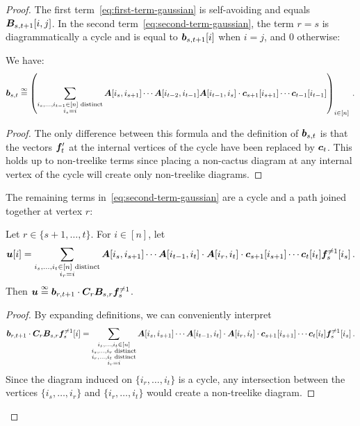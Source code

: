 \begin{proof}
    The first term~\cref{eq:first-term-gaussian} is self-avoiding and equals ${\bm B}_{s,t+1}[i,j]$.
    In the second term~\cref{eq:second-term-gaussian}, the term $r=s$ is diagrammatically a cycle
    and is equal to ${\bm b}_{s,t+1}[i]$ when $i=j$, and $0$ otherwise:

    \begin{claim}\label{lem:bst-c}
    We have:
    \[
        {\bm b}_{s,t} \overset{\infty}{=} \left(\sum_{\substack{i_s,\ldots,i_{t-1}\in[n] \textnormal{ distinct}\\i_s=i}}
        {\bm A}[i_s,i_{s+1}] \cdots {\bm A}[i_{t-2},i_{t-1}] {\bm A}[i_{t-1},i_s] \cdot {\bm c}_{s+1}[i_{s+1}] \cdots {\bm c}_{t-1}[i_{t-1}]\right)_{i\in [n]}\,.
    \]
    \end{claim}
    \begin{proof}
        The only difference between this formula and the definition of ${\bm b}_{s,t}$ is that the vectors ${\bm f}'_t$ at the internal vertices of the cycle have been replaced by ${\bm c}_t$.
        This holds up to non-treelike terms since placing a non-cactus diagram at any internal vertex of the cycle will create only non-treelike diagrams.
    \end{proof}    
    \noindent The remaining terms in~\cref{eq:second-term-gaussian} are a cycle and a path joined together at vertex $r$:
    
    \begin{claim}\label{claim:factorize-inside-path-cycle}
        Let $r\in \{s+1, \ldots, t\}$. For $i\in [n]$, let
        \[
            \bm u[i] =         \sum_{\substack{i_{s},\dots, i_{t} \in [n] \textnormal{ distinct}\\i_{r} = i}} 
    {\bm A}[i_s, i_{s+1}] \cdots {\bm A}[i_{t-1},i_t] \cdot {\bm A}[i_r,i_t] \cdot \bm c_{s+1}[i_{s+1}] \cdots \bm c_{t}[i_{t}] {\bm f}_s^{\neq 1}[i_s]\,.
        \]
        Then $\bm u \overset{\infty}{=} \bm b_{r,t+1} \cdot \bm C_r \bm B_{s,r} {\bm f}_s^{\neq 1}$.
    \end{claim}

    \begin{proof}
        By expanding definitions, we can conveniently interpret
        \[
            \bm b_{r,t+1} \cdot \bm C_r \bm B_{s,r} {\bm f}_s^{\neq 1}[i] = \sum_{\substack{i_{s},\dots, i_{t} \in [n]\\
            i_s,\ldots,i_{r} \textnormal{ distinct}\\
            i_r,\ldots,i_{t}\textnormal{ distinct}\\i_{r} = i}} 
    {\bm A}[i_s, i_{s+1}] \cdots {\bm A}[i_{t-1},i_t] \cdot {\bm A}[i_r,i_t] \cdot \bm c_{s+1}[i_{s+1}] \cdots \bm c_{t}[i_{t}] {\bm f}_s^{\neq 1}[i_s]\,.
        \]
        Since the diagram induced on
        $\{i_r, \ldots, i_t\}$ is
        a cycle, any intersection between the
        vertices $\{i_s, \ldots, i_r\}$
        and $\{i_r, \ldots, i_t\}$
        would create a non-treelike 
        diagram.
    \end{proof}
    

\end{proof}
